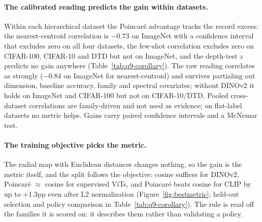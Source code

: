 \documentclass{article}
\theoremstyle{definition}
\begin{document}
\paragraph{The calibrated reading predicts the gain within datasets.} Within each hierarchical dataset the Poincar\'{e} advantage tracks the record excess: the nearest-centroid correlation is $-0.73$ on ImageNet with a confidence interval that excludes zero on all four datasets, the few-shot correlation excludes zero on CIFAR-100, CIFAR-10 and DTD but not on ImageNet, and the depth-test $z$ predicts no gain anywhere (Table~\ref{tab:q9-corollary}). The raw reading correlates as strongly ($-0.84$ on ImageNet for nearest-centroid) and survives partialing out dimension, baseline accuracy, family and spectral covariates; without DINOv2 it holds on ImageNet and CIFAR-100 but not on CIFAR-10/DTD. Pooled cross-dataset correlations are family-driven and not used as evidence; on flat-label datasets no metric helps. Gains carry paired confidence intervals and a McNemar test. %

\paragraph{The training objective picks the metric.} The radial map with Euclidean distances changes nothing, so the gain is the metric itself, and the split follows the objective: cosine suffices for DINOv2, Poincar\'{e} $\approx$ cosine for supervised ViTs, and Poincar\'{e} beats cosine for CLIP by up to +1.3pp even after L2 normalization (Figure~\ref{fig:bestmetric}; held-out selection and policy comparison in Table~\ref{tab:q9-corollary}). The rule is read off the families it is scored on: it describes them rather than validating a policy. %
\end{document}
